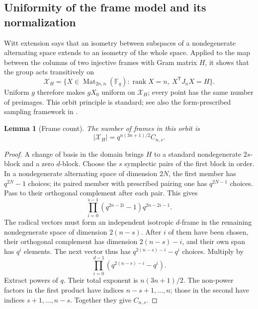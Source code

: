 \documentclass[11pt]{article}
\newcommand{\F}{\mathbb F_q}
\newcommand{\rank}{\operatorname{rank}}
\newcommand{\Mat}{\operatorname{Mat}}
\newcommand{\1}{\mathbf 1}
\newtheorem{lemma}[theorem]{Lemma}
\theoremstyle{definition}
\theoremstyle{remark}
\numberwithin{equation}{section}
\begin{document}
\subsection{Uniformity of the frame model and its normalization}
Witt extension says that an isometry between subspaces of a nondegenerate alternating space extends to an isometry of the whole space. Applied to the map between the columns of two injective frames with Gram matrix $H$, it shows that the group acts transitively on
\[
\mathcal X_H=\{X\in\Mat_{2n,n}(\F):\rank X=n,\ X^{\mathsf T}J_nX=H\}.
\]
Uniform $g$ therefore makes $gX_0$ uniform on $\mathcal X_H$; every point has the same number of preimages. This orbit principle is standard; see also the form-prescribed sampling framework in \cite{ishizuka}.

\begin{lemma}[Frame count]\label{lem:frames}
The number of frames in this orbit is
\begin{equation}\label{eq:frame-count}
|\mathcal X_H|=q^{n(3n+1)/2}C_{n,s}.
\end{equation}
\end{lemma}
\begin{proof}
A change of basis in the domain brings $H$ to a standard nondegenerate $2s$-block and a zero $d$-block. Choose the $s$ symplectic pairs of the first block in order. In a nondegenerate alternating space of dimension $2N$, the first member has $q^{2N}-1$ choices; its paired member with prescribed pairing one has $q^{2N-1}$ choices. Pass to their orthogonal complement after each pair. This gives
\[
\prod_{i=0}^{s-1}(q^{2n-2i}-1)q^{2n-2i-1}.
\]
The radical vectors must form an independent isotropic $d$-frame in the remaining nondegenerate space of dimension $2(n-s)$. After $i$ of them have been chosen, their orthogonal complement has dimension $2(n-s)-i$, and their own span has $q^i$ elements. The next vector thus has $q^{2(n-s)-i}-q^i$ choices. Multiply by
\[
\prod_{i=0}^{d-1}(q^{2(n-s)-i}-q^i).
\]
Extract powers of $q$. Their total exponent is $n(3n+1)/2$. The non-power factors in the first product have indices $n-s+1,\ldots,n$; those in the second have indices $s+1,\ldots,n-s$. Together they give $C_{n,s}$.
\end{proof}
\end{document}
